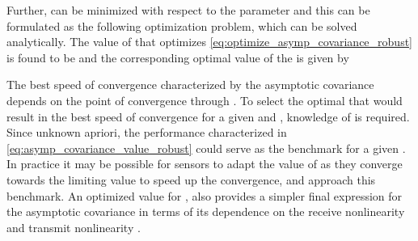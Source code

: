 \documentclass[onecolumn, draft, 12pt]{IEEEtran}
\begin{document}
Further,  can be minimized with respect to the parameter  and this can be formulated as the following optimization problem,
 which can be solved analytically. The value of  that optimizes \eqref{eq:optimize_asymp_covariance_robust} is found to be  and the corresponding optimal value of the is given by

The best speed of convergence characterized by the asymptotic covariance depends on the point of convergence through . To select the optimal  that would result in the best speed of convergence for a given  and , knowledge of  is required. Since  unknown apriori, the performance characterized in \eqref{eq:asymp_covariance_value_robust} could serve as the benchmark for a given . In practice it may be possible for sensors to adapt the value of  as they converge towards the limiting value  to speed up the convergence, and approach this benchmark.  An optimized value for , also provides a simpler final expression for the asymptotic covariance in terms of its dependence on the receive nonlinearity  and transmit nonlinearity .
\end{document}
